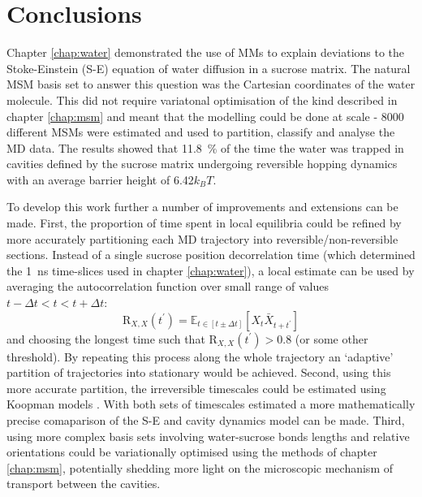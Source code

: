 \let\textcircled=\pgftextcircled
\chapter{Conclusions}
\label{chap:conclusions}



Chapter \ref{chap:water} demonstrated the use of MMs to explain deviations to the Stoke-Einstein (S-E) equation of water diffusion in a sucrose matrix. The natural MSM basis set to answer this question was the Cartesian coordinates of the water molecule. This did not require variatonal optimisation of the kind described in chapter \ref{chap:msm} and meant that the modelling could be done at scale - 8000 different MSMs were estimated and used to partition, classify and analyse the MD data. The results showed that \SI{11.8}{\percent} of the time the water was trapped in cavities defined by the sucrose matrix undergoing reversible hopping dynamics with an average barrier height of \num{6.42}$k_{B}T$. 

To develop this work further a number of improvements and extensions can be made. First, the proportion of time spent in local equilibria could be refined by more accurately partitioning each MD trajectory into reversible/non-reversible sections. Instead of a single sucrose position decorrelation time (which determined the \SI{1}{\nano\second} time-slices used in chapter \ref{chap:water}), a local estimate can be used by averaging the autocorrelation function over small range of values $t-\Delta t < t < t+\Delta t$:
\begin{equation}
\mathrm{R}_{X,  X}(t^{\prime})=\mathbb{E}_{t \in [t\pm\Delta t]}\left[X_{t} \bar{X}_{t+t^{\prime}}\right]
\end{equation}
and choosing the longest time such that $\mathrm{R}_{X,  X}(t^{\prime}) > 0.8$ (or some other threshold). By repeating this process along the whole trajectory an `adaptive' partition of trajectories into stationary would be achieved. Second, using this more accurate partition, the irreversible timescales could be estimated using Koopman models \cite{wuVariationalKoopmanModels2017}. With both sets of timescales estimated a more mathematically precise comaparison of the S-E and cavity dynamics model can be made. Third, using more complex basis sets involving water-sucrose bonds lengths and relative orientations could be  variationally  optimised using the methods of chapter \ref{chap:msm}, potentially shedding more light on the microscopic mechanism of transport between the cavities. 

